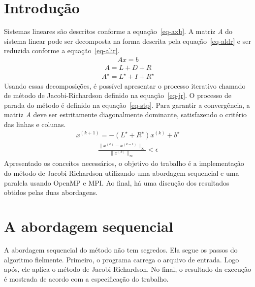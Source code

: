 \documentclass[a4paper]{article}
\begin{document}
\section{Introdução}
\indent \indent Sistemas lineares são descritos conforme a equação~\ref{eq-axb}. A matriz \emph{A} do sistema linear pode ser decomposta na forma descrita pela equação~\ref{eq-aldr} e ser reduzida conforme a equação~\ref{eq-alir}.
\begin{eqnarray} \label{eq-axb}
	Ax = b
\end{eqnarray}
\begin{eqnarray} \label{eq-aldr}
	A = L + D + R
\end{eqnarray}
\begin{eqnarray} \label{eq-alir}
	A^\star = L^\star + I + R^\star 
\end{eqnarray}
\indent Usando essas decomposições, é possível apresentar o processo iterativo chamado de método de Jacobi-Richardson definido na equação~\ref{eq-jr}. O processo de parada do método é definido na equação~\ref{eq-stp}. Para garantir a convergência, a matriz \emph{A} deve ser estritamente diagonalmente dominante, satisfazendo o critério das linhas e colunas.
\begin{eqnarray} \label{eq-jr}
	x^{(k+1)} = -(L^\star + R^\star)x^{(k)} + b^\star
\end{eqnarray}
\begin{eqnarray} \label{eq-stp}
	\frac{\parallel x^{(k)} - x^{(k-1)}\parallel_\infty}{\parallel x^{(k)}\parallel_\infty} < \epsilon
\end{eqnarray}
\indent Apresentado os conceitos necessários, o objetivo do trabalho é a implementação do método de Jacobi-Richardson utilizando uma abordagem sequencial e uma paralela usando OpenMP e MPI. Ao final, há uma discução dos resultados obtidos pelas duas abordagens.

\section{A abordagem sequencial}
\indent \indent A abordagem sequencial do método não tem segredos. Ela segue os passos do algoritmo fielmente. Primeiro, o programa carrega o arquivo de entrada. Logo após, ele aplica o método de Jacobi-Richardson. No final, o resultado da execução é mostrada de acordo com a especificação do trabalho.
\end{document}
